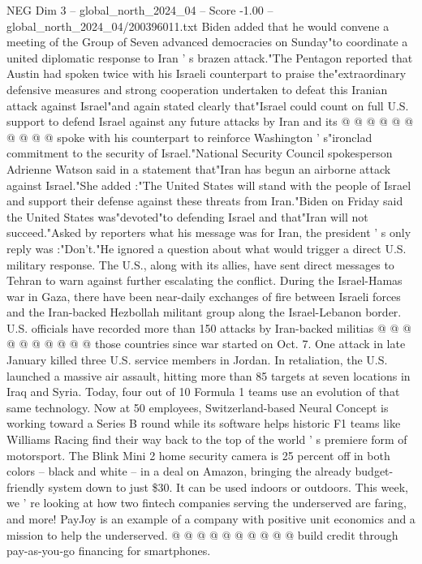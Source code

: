 \begin{textsample}{NEG Dim 3 – global\_north\_2024\_04 – Score -1.00 – global\_north\_2024\_04/200396011.txt}
Biden added that he would convene a meeting of the Group of Seven advanced democracies on Sunday"to coordinate a united diplomatic response to Iran ' s brazen attack."The Pentagon reported that Austin had spoken twice with his Israeli counterpart to praise the"extraordinary defensive measures and strong cooperation undertaken to defeat this Iranian attack against Israel"and again stated clearly that"Israel could count on full U.S. support to defend Israel against any future attacks by Iran and its @ @ @ @ @ @ @ @ @ @ spoke with his counterpart to reinforce Washington ' s"ironclad commitment to the security of Israel."National Security Council spokesperson Adrienne Watson said in a statement that"Iran has begun an airborne attack against Israel."She added :"The United States will stand with the people of Israel and support their defense against these threats from Iran."Biden on Friday said the United States was"devoted"to defending Israel and that"Iran will not succeed."Asked by reporters what his message was for Iran, the president ' s only reply was :"Don't."He ignored a question about what would trigger a direct U.S. military response.
The U.S., along with its allies, have sent direct messages to Tehran to warn against further escalating the conflict.
During the Israel-Hamas war in Gaza, there have been near-daily exchanges of fire between Israeli forces and the Iran-backed Hezbollah militant group along the Israel-Lebanon border.
U.S. officials have recorded more than 150 attacks by Iran-backed militias @ @ @ @ @ @ @ @ @ @ those countries since war started on Oct. 7.
One attack in late January killed three U.S. service members in Jordan.
In retaliation, the U.S. launched a massive air assault, hitting more than 85 targets at seven locations in Iraq and Syria.
Today, four out of 10 Formula 1 teams use an evolution of that same technology.
Now at 50 employees, Switzerland-based Neural Concept is working toward a Series B round while its software helps historic F1 teams like Williams Racing find their way back to the top of the world ' s premiere form of motorsport.
The Blink Mini 2 home security camera is 25 percent off in both colors -- black and white -- in a deal on Amazon, bringing the already budget-friendly system down to just \$30.
It can be used indoors or outdoors.
This week, we ' re looking at how two fintech companies serving the underserved are faring, and more!
PayJoy is an example of a company with positive unit economics and a mission to help the underserved. @ @ @ @ @ @ @ @ @ @ build credit through pay-as-you-go financing for smartphones.

\end{textsample}
